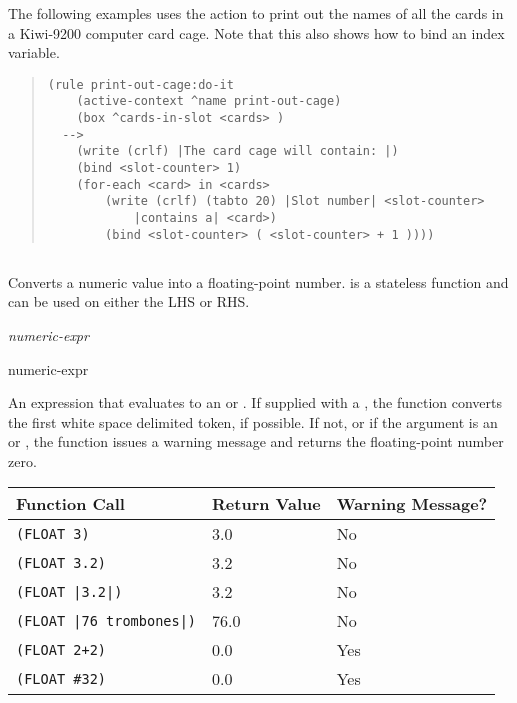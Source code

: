 \Example

The following examples uses the  action to print out the
names of all the cards in a Kiwi-9200 computer card cage.  Note that
this also shows how to bind an index variable.

\begin{quote}
\begin{verbatim}
(rule print-out-cage:do-it
    (active-context ^name print-out-cage)
    (box ^cards-in-slot <cards> )
  -->
    (write (crlf) |The card cage will contain: |)
    (bind <slot-counter> 1)
    (for-each <card> in <cards>
        (write (crlf) (tabto 20) |Slot number| <slot-counter>
            |contains a| <card>)
        (bind <slot-counter> ( <slot-counter> + 1 ))))
\end{verbatim}
\end{quote}

\subsection{}

Converts a numeric value into a floating-point number.  is a
stateless function and can be used on either the LHS or RHS.

\Format

 \it{numeric-expr}

\begin{argument}
\item[numeric-expr]

  An expression that evaluates to an  or . If
  supplied with a , the  function converts the
  first white space delimited token, if possible. If not, or if the
  argument is an  or , the function issues
  a warning message and returns the floating-point number zero.
\end{argument}

\begin{center}
  \begin{tabular}{lll}
    \toprule
    Function Call & Return Value &  Warning Message? \\
    \midrule
    \verb,(FLOAT 3), & 3.0  & No \\
    \verb,(FLOAT 3.2), &  3.2 & No \\
    \verb,(FLOAT |3.2|), &  3.2 & No \\
    \verb,(FLOAT |76 trombones|), & 76.0 &  No \\
    \verb,(FLOAT 2+2), & 0.0 & Yes \\
    \verb,(FLOAT #32), &  0.0 &  Yes \\
    \bottomrule
  \end{tabular}
\end{center}

